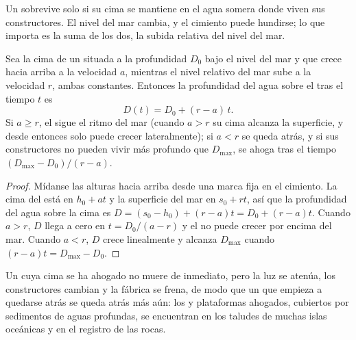 Un  sobrevive solo si su cima se mantiene en el agua somera donde viven sus constructores. El nivel del mar cambia, y el cimiento puede hundirse; lo que importa es la suma de
los dos, la subida relativa del nivel del mar.

\begin{proposition}\label{prop:b1:chemical-biogenic-sediments:keep-up}
Sea la cima de un  situada a la profundidad $D_0$ bajo el nivel del mar y que crece hacia arriba a la velocidad $a$, mientras el nivel relativo del mar sube a la velocidad $r$,
ambas constantes. Entonces la profundidad del agua sobre el  tras el tiempo $t$ es
\[
D(t) = D_0 + (r - a)\,t .
\]
Si $a \ge r$, el  sigue el ritmo del mar (cuando $a > r$ su cima alcanza la superficie, y desde entonces solo puede crecer lateralmente); si $a < r$ se queda atrás, y si sus constructores
no pueden vivir más profundo que $D_{\max}$, se ahoga tras el tiempo $(D_{\max} - D_0)/(r - a)$.
\end{proposition}

\begin{proof}
Mídanse las alturas hacia arriba desde una marca fija en el cimiento. La cima del  está en $h_0 + a t$ y la superficie del mar en $s_0 + r t$, así que la profundidad del agua
sobre la cima es $D = (s_0 - h_0) + (r - a)t = D_0 + (r-a)t$. Cuando $a > r$, $D$ llega a cero en $t = D_0/(a-r)$ y el  no puede crecer por encima del mar. Cuando
$a < r$, $D$ crece linealmente y alcanza $D_{\max}$ cuando $(r-a)t = D_{\max} -
D_0$.
\end{proof}

Un  cuya cima se ha ahogado no muere de inmediato, pero la luz se atenúa, los constructores cambian y la fábrica se frena, de modo que un  que empieza a quedarse atrás se
queda atrás más aún: los  y plataformas ahogados, cubiertos por sedimentos de aguas profundas, se encuentran en los taludes de muchas islas oceánicas y en el registro de las rocas.

